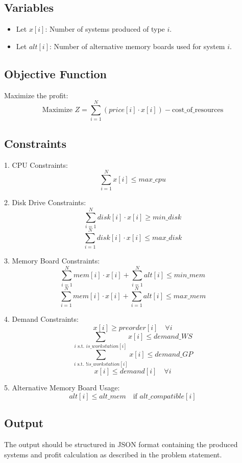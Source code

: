 \documentclass{article}
\begin{document}
\subsection*{Variables}
\begin{itemize}
    \item Let \( x[i] \): Number of systems produced of type \( i \).
    \item Let \( alt[i] \): Number of alternative memory boards used for system \( i \).
\end{itemize}

\subsection*{Objective Function}
Maximize the profit:
\[
\text{Maximize } Z = \sum_{i=1}^{N} (price[i] \cdot x[i]) - \text{cost\_of\_resources}
\]

\subsection*{Constraints}
1. CPU Constraints:
\[
\sum_{i=1}^{N} x[i] \leq max\_cpu
\]

2. Disk Drive Constraints:
\[
\sum_{i=1}^{N} disk[i] \cdot x[i] \geq min\_disk
\]
\[
\sum_{i=1}^{N} disk[i] \cdot x[i] \leq max\_disk
\]

3. Memory Board Constraints:
\[
\sum_{i=1}^{N} mem[i] \cdot x[i] + \sum_{i=1}^{N} alt[i] \leq min\_mem
\]
\[
\sum_{i=1}^{N} mem[i] \cdot x[i] + \sum_{i=1}^{N} alt[i] \leq max\_mem
\]

4. Demand Constraints:
\[
x[i] \geq preorder[i] \quad \forall i
\]
\[
\sum_{i \text{ s.t. } is\_workstation[i]} x[i] \leq demand\_WS
\]
\[
\sum_{i \text{ s.t. } !is\_workstation[i]} x[i] \leq demand\_GP
\]
\[
x[i] \leq demand[i] \quad \forall i
\]

5. Alternative Memory Board Usage:
\[
alt[i] \leq alt\_mem \quad \text{if } alt\_compatible[i]
\]

\subsection*{Output}
The output should be structured in JSON format containing the produced systems and profit calculation as described in the problem statement.
\end{document}

